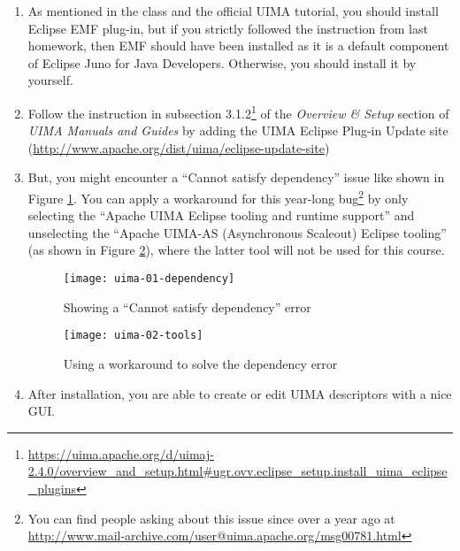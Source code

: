 \begin{enumerate}

\item As mentioned in the class and the official UIMA tutorial, you should
install Eclipse EMF plug-in, but if you strictly followed the instruction from
last homework, then EMF should have been installed as it is a default component
of Eclipse Juno for Java Developers. Otherwise, you should install it by
yourself.

\item Follow the instruction in subsection
3.1.2\footnote{\url{https://uima.apache.org/d/uimaj-2.4.0/overview_and_setup.html\#ugr.ovv.eclipse_setup.install_uima_eclipse_plugins}}
of the \emph{Overview \& Setup} section of \emph{UIMA Manuals and Guides} by
adding the UIMA Eclipse Plug-in Update site
(\url{http://www.apache.org/dist/uima/eclipse-update-site})

\item But, you might encounter a ``Cannot satisfy dependency'' issue like shown
in Figure \ref{fig:uima-01-dependency}. You can apply a workaround for this
year-long bug\footnote{You can find people asking about this issue since over a
year ago at
\url{http://www.mail-archive.com/user@uima.apache.org/msg00781.html}} by only
selecting the ``Apache UIMA Eclipse tooling and runtime support'' and
unselecting the ``Apache UIMA-AS (Asynchronous Scaleout) Eclipse tooling'' (as
shown in Figure \ref{fig:uima-02-tools}), where the latter tool will not be used
for this course.

\begin{figure}[t]
\centering
\texttt{[image: uima-01-dependency]}
\caption{Showing a ``Cannot satisfy dependency'' error\label{fig:uima-01-dependency}}
\end{figure}

\begin{figure}[t]
\centering
\texttt{[image: uima-02-tools]}
\caption{Using a workaround to solve the dependency error\label{fig:uima-02-tools}}
\end{figure}

\item After installation, you are able to create or edit UIMA descriptors with a
nice GUI.
 
\end{enumerate}
